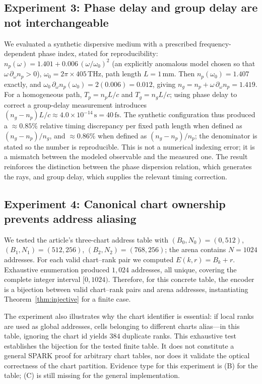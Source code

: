 \documentclass[11pt]{article}
\begin{document}
\subsection{Experiment 3: Phase delay and group delay are not interchangeable}

We evaluated a synthetic dispersive medium with a prescribed frequency-dependent phase
index, stated for reproducibility:
$n_p(\omega) = 1.401 + 0.006\,(\omega/\omega_0)^2$ (an explicitly anomalous model chosen so
that $\omega\,\partial_\omega n_p > 0$),
$\omega_0 = 2\pi \times 405\,\mathrm{THz}$,
path length $L = 1\,\mathrm{mm}$. Then
$n_p(\omega_0) = 1.407$ exactly, and $\omega_0\,\partial_\omega n_p(\omega_0) = 2(0.006) =
0.012$, giving $n_g = n_p + \omega\,\partial_\omega n_p = 1.419$. For a homogeneous path,
$T_p = n_p L / c$ and $T_g = n_g L / c$; using phase delay to correct a group-delay
measurement introduces $(n_g - n_p) L / c \approx 4.0\times10^{-14}\,\mathrm{s} =
40\,\mathrm{fs}$. The synthetic configuration thus produced a $\approx 0.85\%$ relative
timing discrepancy per fixed path length when defined as $(n_g-n_p)/n_g$, and
$\approx 0.86\%$ when defined as $(n_g-n_p)/n_p$; the denominator is stated so the
number is reproducible. This is not a numerical indexing error; it is a mismatch between
the modeled observable and the measured one. The result reinforces the distinction
between the phase dispersion relation, which generates the rays, and group delay, which
supplies the relevant timing correction.

\subsection{Experiment 4: Canonical chart ownership prevents address aliasing}

We tested the article's three-chart address table with
$(B_0, N_0) = (0, 512)$, $(B_1, N_1) = (512, 256)$, $(B_2, N_2) = (768, 256)$; the arena
contains $N = 1024$ addresses. For each valid chart--rank pair we computed
$E(k,r) = B_k + r$. Exhaustive enumeration produced $1{,}024$ addresses, all unique,
covering the complete integer interval $[0, 1024)$. Therefore, for this concrete table,
the encoder is a bijection between valid chart--rank pairs and arena addresses,
instantiating Theorem~\ref{thm:injective} for a finite case.

The experiment also illustrates why the chart identifier is essential: if local ranks
are used as global addresses, cells belonging to different charts alias---in this table,
ignoring the chart id yields $384$ duplicate ranks. This exhaustive test establishes the
bijection for the tested finite table. It does not constitute a general SPARK proof for
arbitrary chart tables, nor does it validate the optical correctness of the chart
partition. Evidence type for this experiment is (B) for the table; (C) is still missing
for the general implementation.
\end{document}
